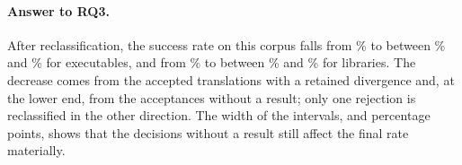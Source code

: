 \paragraph{Answer to RQ3.} After reclassification, the success rate on this corpus falls from \rqSRExeAllPct\% to between \rqSRLoExeAllPct\% and \% for executables, and from \rqSRLibAllPct\% to between \rqSRLoLibAllPct\% and \rqSRUpLibAllPct\% for libraries. The decrease comes from the accepted translations with a retained divergence and, at the lower end, from the acceptances without a result; only one rejection is reclassified in the other direction. The width of the intervals, \widthE{} and \rqSRWidthTightLibAllPct{} percentage points, shows that the decisions without a result still affect the final rate materially.
